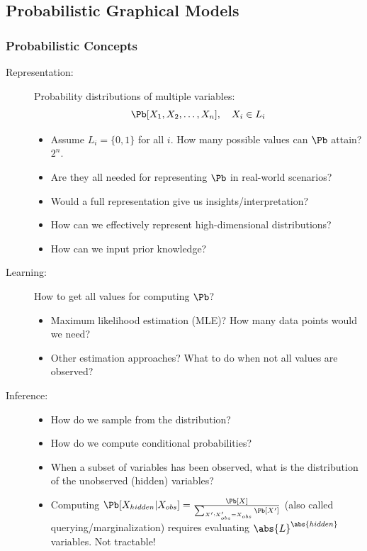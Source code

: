\subsection*{Probabilistic Graphical Models}
\begin{frame}
    \frametitle{Probabilistic Concepts}
\begin{description}
\item[Representation:] Probability distributions of multiple variables:
 \begin{equation}
 \Pb[X_1,X_2,\ldots,X_n], \quad X_i \in L_i
 \end{equation}
 \begin{itemize}
    \item Assume $L_i = \{0,1\}$ for all $i$. How many possible values can $\Pb$ attain? \pause $2^n$.
    \pause \item Are they all needed for representing $\Pb$ in real-world scenarios?
    \pause \item Would a full representation give us insights/interpretation?
    \pause \item How can we effectively represent high-dimensional distributions?
    \item How can we input prior knowledge?
\end{itemize}
\pause
\item[Learning:] How to get all values for computing $\Pb$?
\begin{itemize}
    \pause \item Maximum likelihood estimation (MLE)? How many data points would we need?
\pause \item Other estimation approaches? \pause What to do when not all values are observed?
\end{itemize}
\pause \item[Inference:] 
\begin{itemize}
    \item How do we sample from the distribution? 
    \pause \item How do we compute conditional probabilities?
    \pause \item When a subset of variables has been observed, what is the distribution of the unobserved (hidden) variables?
    \pause \item Computing $\Pb[X_{hidden}|X_{obs}] = \frac{\Pb[X]}{\sum_{X' : X'_{obs} = X_{obs}} \Pb[X']}$ (also called querying/marginalization) requires evaluating $\abs{L}^{\abs{hidden}}$ variables. \pause Not tractable!
\end{itemize}
\end{description}
\end{frame}

